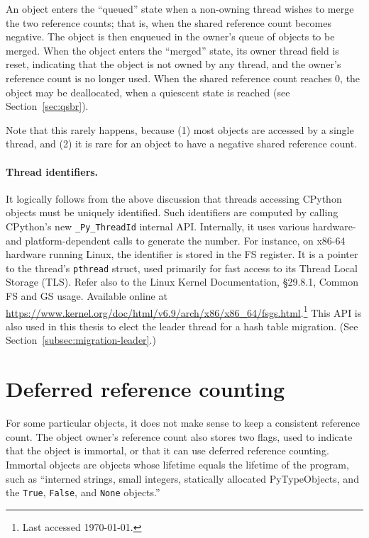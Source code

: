 An object enters the ``queued'' state when a non-owning thread wishes to merge the two reference counts; that is, when the shared reference count becomes negative.
The object is then enqueued in the owner's queue of objects to be merged.
When the object enters the ``merged'' state, its owner thread field is reset, indicating that the object is not owned by any thread, and the owner's reference count is no longer used.
When the shared reference count reaches 0, the object may be deallocated, when a quiescent state is reached (see Section~\ref{sec:qsbr}).

Note that this rarely happens, because (1) most objects are accessed by a single thread, and (2) it is rare for an object to have a negative shared reference count.


\paragraph{Thread identifiers.}
It logically follows from the above discussion that threads accessing CPython objects must be uniquely identified.
Such identifiers are computed by calling CPython's new \texttt{\_Py\_ThreadId} internal API\@.
Internally, it uses various hardware- and platform-dependent calls to generate the number.
For instance, on x86-64 hardware running Linux, the identifier is stored in the FS register.
It is a pointer to the thread's \texttt{pthread} struct, used primarily for fast access to its Thread Local Storage (TLS).
Refer also to the Linux Kernel Documentation, \S29.8.1, Common FS and GS usage.
Available online at \url{https://www.kernel.org/doc/html/v6.9/arch/x86/x86_64/fsgs.html}.\footnote{Last accessed \today.}
This API is also used in this thesis to elect the leader thread for a hash table migration.
(See Section~\ref{subsec:migration-leader}.)


\section{Deferred reference counting}\label{sec:deferred-reference-counting}

For some particular objects, it does not make sense to keep a consistent reference count.
The object owner's reference count also stores two flags, used to indicate that the object is immortal, or that it can use deferred reference counting.
Immortal objects are objects whose lifetime equals the lifetime of the program, such as ``interned strings, small integers, statically allocated PyTypeObjects, and the \texttt{True}, \texttt{False}, and \texttt{None} objects.''

